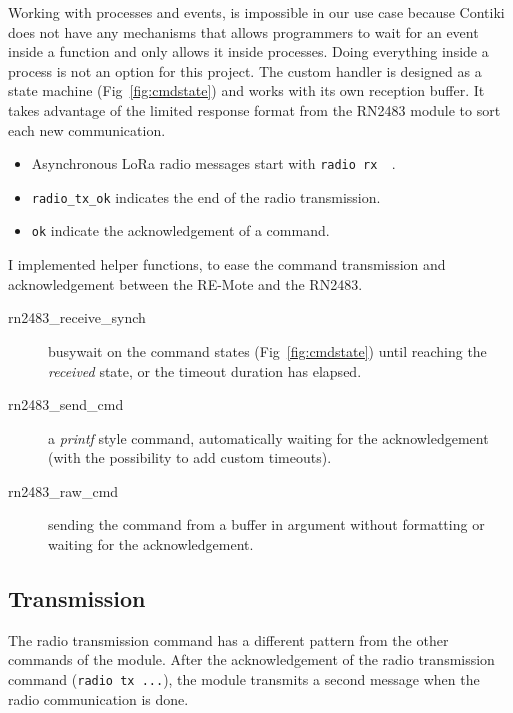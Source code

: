 Working with processes and events, is impossible in our use case because Contiki 
does not have any mechanisms that allows programmers to wait for an event inside a 
function and only allows it inside processes.
Doing everything inside a process is not an option for this project.
The custom handler is designed as a state machine (Fig~\ref{fig:cmdstate}) and 
works with its own reception buffer. It takes advantage of the limited response 
format from the RN2483 module to sort each new communication.

\begin{itemize}
  \item Asynchronous LoRa radio messages start with \lstinline{radio rx  }.
  \item \lstinline{radio_tx_ok} indicates the end of the radio transmission. 
  \item \lstinline{ok} indicate the acknowledgement of a command.
\end{itemize}


I implemented helper functions, to ease the command transmission and
acknowledgement between the RE-Mote and the RN2483.

\begin{description}
  \item[rn2483\_receive\_synch] busywait on the command states
    (Fig~\ref{fig:cmdstate}) until reaching the \emph{received} state, 
    or the timeout duration has elapsed.
  \item[rn2483\_send\_cmd] a \emph{printf} style command, automatically 
    waiting for the acknowledgement (with the possibility to add custom timeouts).
  \item[rn2483\_raw\_cmd] sending the command from a buffer in argument
    without formatting or waiting for the acknowledgement.
\end{description}



\subsection{Transmission}

The radio transmission command has a different pattern from the other commands 
of the module. 
After the acknowledgement of the radio transmission command (\lstinline{radio tx ...}),
the module transmits a second message when the radio communication is done.

